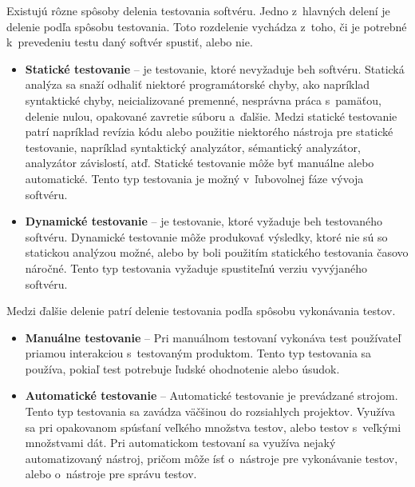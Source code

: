 Existujú rôzne spôsoby delenia testovania softvéru. 
Jedno z~hlavných delení je delenie podľa spôsobu testovania.
Toto rozdelenie vychádza z~toho, či je potrebné k~prevedeniu 
testu daný softvér spustiť, alebo nie.
\begin{itemize}
\item \textbf{Statické testovanie} --
je testovanie, ktoré nevyžaduje beh softvéru. 
Statická analýza sa snaží odhaliť niektoré programátorské chyby, 
ako napríklad syntaktické chyby, neicializované premenné, 
nesprávna práca s~pamäťou, delenie nulou, opakované zavretie súboru 
a~ďalšie. 
Medzi statické testovanie patrí napríklad revízia kódu alebo použitie 
niektorého nástroja pre statické testovanie, napríklad 
syntaktický analyzátor, sémantický analyzátor, analyzátor závislostí, atď. 
Statické testovanie môže byť manuálne alebo automatické. 
Tento typ testovania je možný v~ľubovolnej fáze vývoja softvéru.

\item \textbf{Dynamické testovanie} -- 
je testovanie, ktoré vyžaduje beh testovaného softvéru. 
Dynamické testovanie môže produkovať výsledky, ktoré nie sú so statickou 
analýzou možné, alebo by boli použitím statického testovania časovo náročné. 
Tento typ testovania vyžaduje spustiteľnú verziu vyvýjaného softvéru.
\end{itemize}


\noindent Medzi ďalšie delenie patrí delenie testovania podľa spôsobu 
vykonávania testov.
\begin{itemize}
\item \textbf{Manuálne testovanie} --
Pri manuálnom testovaní vykonáva test používateľ priamou interakciou 
s~testovaným produktom. Tento typ testovania sa používa, pokiaľ test 
potrebuje ľudské ohodnotenie alebo úsudok.

\item \textbf{Automatické testovanie} --
Automatické testovanie je prevádzané strojom.
Tento typ testovania sa zavádza väčšinou do rozsiahlych projektov.
Využíva sa pri opakovanom spúsťaní veľkého množstva testov, alebo testov
s~veľkými množstvami dát. Pri automatickom testovaní sa využíva nejaký 
automatizovaný nástroj, pričom môže ísť o~nástroje 
pre vykonávanie testov, alebo o~nástroje pre správu testov.
\end{itemize}

